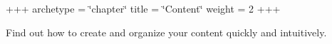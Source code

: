 +++ archetype = \char`\"{}chapter\char`\"{} title = \char`\"{}\+Content\char`\"{} weight = 2 +++

Find out how to create and organize your content quickly and intuitively. 